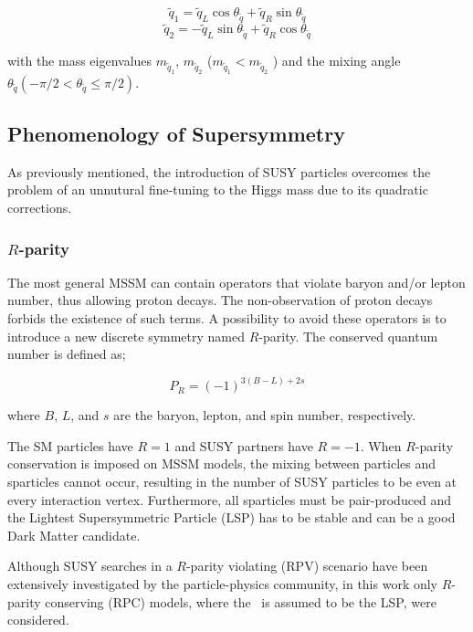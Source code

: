 				$$ \tilde{q}_1 = \tilde{q}_L \cos \theta_{\tilde{q}} + \tilde{q}_R \sin \theta_{\tilde{q}} $$
				$$ \tilde{q}_2 = - \tilde{q}_L \sin \theta_{\tilde{q}} + \tilde{q}_R \cos \theta_{\tilde{q}} $$
				
				\noindent with the mass eigenvalues $m_{\tilde{q}_1}$, $m_{\tilde{q}_2}$ ($m_{\tilde{q}_1} < m_{\tilde{q}_2}$ ) and the mixing angle $\theta_{\tilde{q}} \left (- \pi / 2 < \theta_{\tilde{q}} \leq \pi / 2 \right )$. 




		\subsection{Phenomenology of Supersymmetry}
		\label{sec:SUSYPheno}

			As previously mentioned, the introduction of SUSY particles overcomes the problem of an unnutural fine-tuning to the Higgs mass due to its quadratic corrections.%

			\subsubsection*{$R$-parity}
				
				The most general MSSM can contain operators that violate baryon and/or lepton number, thus allowing proton decays. The non-observation of proton decays forbids the existence of such terms. A possibility to avoid these operators is to introduce a new discrete symmetry named $R$-parity. The conserved quantum number is defined as;

				\begin{equation}
					P_R = \left ( -1 \right )^{3 \left (B - L \right )+ 2s}
				\end{equation}

				\noindent where $B$, $L$, and $s$ are the baryon, lepton, and spin number, respectively.	

				The SM particles have $R = 1$ and SUSY partners have $R=-1$. When $R$-parity conservation is imposed on MSSM models, the mixing between particles and sparticles cannot occur, resulting in the number of SUSY particles to be even at every interaction vertex. Furthermore, all sparticles must be pair-produced and the Lightest Supersymmetric Particle (LSP) has to be stable and can be a good Dark Matter candidate. %

				Although SUSY searches in a $R$-parity violating (RPV) scenario have been extensively investigated by the particle-physics community, in this work only $R$-parity conserving (RPC) models, where the \ninoone\ is assumed to be the LSP, were considered.


